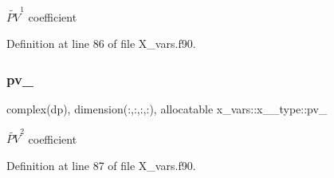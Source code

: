 $\widetilde{PV}^1$ coefficient 



Definition at line 86 of file X\+\_\+vars.\+f90.

\mbox{\label{structx__vars_1_1x__2__type_a02ca37a3af02f70acbc536d20a70bd0e}} 
\subsubsection{\texorpdfstring{pv\+\_}{pv\_2}}
{\footnotesize\ttfamily complex(dp), dimension(\+:,\+:,\+:,\+:), allocatable x\+\_\+vars\+::x\+\_\+\_\+type\+::pv\+\_}



$\widetilde{PV}^2$ coefficient 



Definition at line 87 of file X\+\_\+vars.\+f90.



